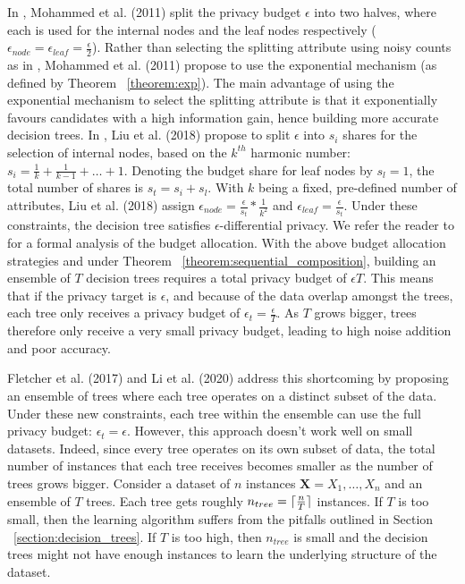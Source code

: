 In \cite{mohammed}, Mohammed et al. (2011) split the privacy budget $\epsilon$ into two halves, where each is used for the internal nodes and the leaf nodes respectively ($\epsilon_{node} = \epsilon_{leaf} = \frac{\epsilon}{2}$). Rather than selecting the splitting attribute using noisy counts as in \cite{jagannathan}, Mohammed et al. (2011) propose to use the exponential mechanism (as defined by Theorem ~\ref{theorem:exp}). The main advantage of using the exponential mechanism to select the splitting attribute is that it exponentially favours candidates with a high information gain, hence building more accurate decision trees. In \cite{liu}, Liu et al. (2018) propose to split $\epsilon$ into $s_i$ shares for the selection of internal nodes, based on the $k^{th}$ harmonic number: $s_i = \frac{1}{k} + \frac{1}{k-1} + \dots + 1$. Denoting the budget share for leaf nodes by $s_l = 1$, the total number of shares is $s_t = s_i + s_l$. With $k$ being a fixed, pre-defined number of attributes, Liu et al. (2018) assign $\epsilon_{node} = \frac{\epsilon}{s_t} * \frac{1}{k^2}$ and $\epsilon_{leaf} = \frac{\epsilon}{s_t}.$ Under these constraints, the decision tree satisfies $\epsilon$-differential privacy. We refer the reader to \cite{liu} for a formal analysis of the budget allocation. With the above budget allocation strategies and under Theorem ~\ref{theorem:sequential_composition}, building an ensemble of $T$ decision trees requires a total privacy budget of $\epsilon T$. This means that if the privacy target is $\epsilon$, and because of the data overlap amongst the trees, each tree only receives  a privacy budget of $\epsilon_{t} = \frac{\epsilon}{T}$. As $T$ grows bigger, trees therefore only receive a very small privacy budget, leading to high noise addition and poor accuracy.

Fletcher et al. (2017) \cite{fletcher_smooth} and Li et al. (2020) \cite{dpgbdt} address this shortcoming by proposing an ensemble of trees where each tree operates on a distinct subset of the data. Under these new constraints, each tree within the ensemble can use the full privacy budget: $\epsilon_{t} = \epsilon$. However, this approach doesn't work well on small datasets. Indeed, since every tree operates on its own subset of data, the total number of instances that each tree receives becomes smaller as the number of trees grows bigger. Consider a dataset of $n$ instances $\textbf{X} = X_1,\dots,X_n$ and an ensemble of $T$ trees. Each tree gets roughly $n_{tree} = \lceil\frac{n}{T}\rceil$ instances. If $T$ is too small, then the learning algorithm suffers from the pitfalls outlined in Section ~\ref{section:decision_trees}. If $T$ is too high, then $n_{tree}$ is small and the decision trees might not have enough instances to learn the underlying structure of the dataset.

